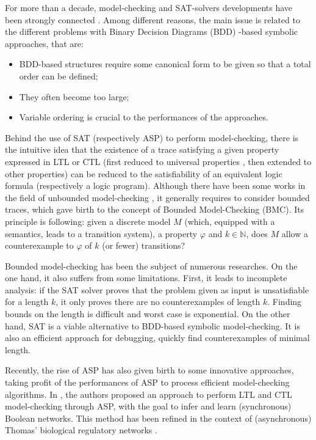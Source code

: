 For more than a decade, model-checking and SAT-solvers developments have been strongly connected \cite{biere1999symbolic}. Among different reasons, the main issue is related to the different problems with Binary Decision Diagrams (BDD) -based symbolic approaches, that are:
\begin{itemize}
\item BDD-based structures require some canonical form to be given so that a total order can be defined; 
\item They often become too large;
\item Variable ordering is crucial to the performances of the approaches.  
\end{itemize}

Behind the use of SAT (respectively ASP) to perform model-checking, there is the intuitive idea that the existence of a trace satisfying a given property expressed in LTL \cite{biere1999symbolic} or CTL (first reduced to universal properties \cite{penczek2002bounded}, then extended to other properties) can be reduced to the satisfiability of an equivalent logic formula (respectively a logic program). Although there have been some works in the field of unbounded model-checking \cite{mcmillan2002applying}, it generally requires to consider bounded traces, which gave birth to the concept of Bounded Model-Checking (BMC). Its principle is following: given a discrete model $M$ (which, equipped with a semantics, leads to a transition system), a property $\varphi$ and $k \in \mathbb{N}$, does $M$ allow a counterexample to $\varphi$ of $k$ (or fewer) transitions? 

Bounded model-checking has been the subject of numerous researches. On the one hand, it also suffers from some limitations. First, it leads to incomplete analysis: if the SAT solver proves that the problem given as input is unsatisfiable for a length $k$, it only proves there are no counterexamples of length $k$. Finding bounds on the length is difficult and worst case is exponential. On the other hand, SAT is a viable alternative to BDD-based symbolic model-checking. It is also an efficient approach for debugging, \ie quickly find counterexamples of minimal length. 

Recently, the rise of ASP has also given birth to some innovative approaches, taking profit of the performances of ASP to process efficient model-checking algorithms. In \cite{rocca2013inference}, the authors proposed an approach to perform LTL and CTL model-checking through ASP, with the goal to infer and learn (synchronous) Boolean networks. This method has been refined in the context of (asynchronous) Thomas' biological regulatory networks \cite{roccaasp}. 

